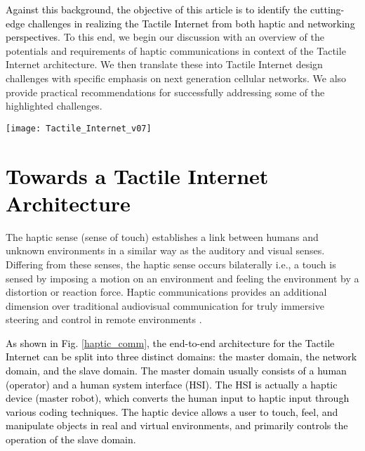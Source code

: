 \documentclass[journal]{IEEEtran}
\begin{document}
\textcolor{black}{Against this background, the objective of this article is to identify the cutting-edge challenges in realizing the Tactile Internet from both haptic and networking perspectives}. To this end, we begin our discussion with an overview of the potentials and requirements of haptic communications in context of the Tactile Internet architecture. We then translate these into Tactile Internet design challenges with specific emphasis on next generation cellular networks. We also provide practical recommendations for successfully addressing some of the highlighted challenges.



















\begin{figure*}
\centering
\texttt{[image: Tactile\_Internet\_v07]}
\caption{ Functional architecture of the Tactile Internet \textcolor{black}{providing the medium for haptic transport}. }
\label{haptic_comm}
\end{figure*}

\section{\textcolor{black}{Towards a Tactile Internet Architecture}}
The haptic sense (sense of touch) establishes a link between humans and unknown environments in a similar way as the auditory and visual senses. Differing from these senses, the haptic sense occurs bilaterally i.e., a touch is sensed by imposing a motion on an environment and feeling the environment by a distortion or reaction force. Haptic communications provides an additional dimension over traditional audiovisual communication for truly immersive steering and control in remote environments \cite{HC}.

\textcolor{black}{As shown in Fig. \ref{haptic_comm}, the end-to-end architecture for the Tactile Internet can be split into three distinct domains: the master domain, the network domain, and the slave domain. The master domain usually consists of a human (operator) and a human system interface (HSI). The HSI is actually a haptic device (master robot), which converts the human input
to haptic input through various  coding techniques. The haptic device allows a user to touch, feel, and manipulate objects in real and virtual environments, and primarily controls the operation of the slave domain.}
\end{document}
